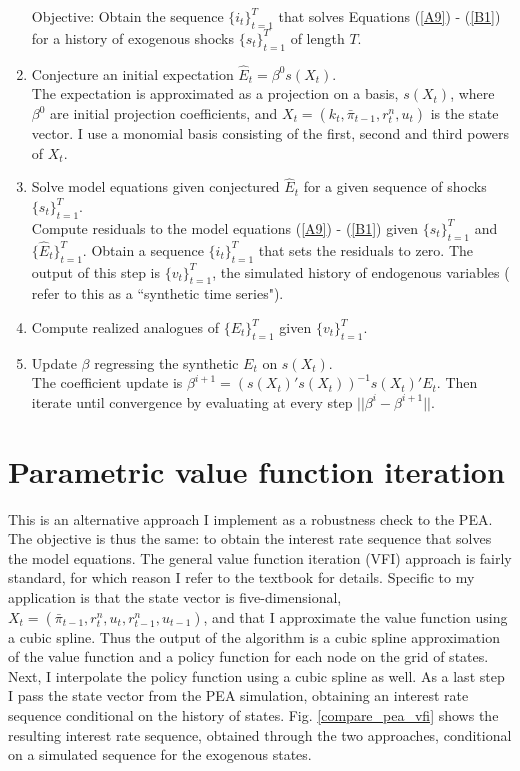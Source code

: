 \documentclass[11pt]{article}
\renewcommand{\[}{\begin{equation}}
\renewcommand{\]}{\end{equation}}
\begin{document}
\begin{enumerate}
\item[Objective:] Obtain the sequence $\{i_t\}_{t=1}^T$ that solves Equations (\ref{A9}) - (\ref{B1}) for a history of exogenous shocks $\{s_t\}_{t=1}^T$ of length $T$. 
\item Conjecture an initial expectation $\hat{E}_t=\beta^0 s(X_t)$. \\
The expectation is approximated as a projection on a basis, $s(X_t)$, where $\beta^0$ are initial projection coefficients, and $X_t = (k_t,\bar{\pi}_{t-1}, r^n_t, u_t)$ is the state vector. I use a monomial basis consisting of the first, second and third powers of $X_t$.
\item Solve model equations given conjectured $\hat{E}_t$ for a given sequence of shocks $\{s_t\}_{t=1}^T$.\\
Compute residuals to the model equations (\ref{A9}) - (\ref{B1}) given $\{s_t\}_{t=1}^T$ and $\{\hat{E}_t\}_{t=1}^T$. Obtain a sequence $\{i_t\}_{t=1}^T$ that sets the residuals to zero. The output of this step is $\{v_t\}_{t=1}^T$, the simulated history of endogenous variables (\cite{christiano2000occasionally} refer to this as a ``synthetic time series"). 
\item Compute realized analogues of $\{E_t\}_{t=1}^T$ given $\{v_t\}_{t=1}^T$.
\item Update $\beta$ regressing the synthetic $E_t$ on $s(X_t)$.\\
The coefficient update is $\beta^{i+1} = (s(X_t)'s(X_t))^{-1}s(X_t)'E_t$. Then iterate until convergence by evaluating at every step $||\beta^i-\beta^{i+1}||$.
\end{enumerate}

\section{Parametric value function iteration} \label{vfi}
This is an alternative approach I implement as a robustness check to the PEA. The objective is thus the same: to obtain the interest rate sequence that solves the model equations. The general value function iteration (VFI) approach is fairly standard, for which reason I refer to the \cite{judd1998numerical} textbook for details. Specific to my application is that the state vector is five-dimensional, $X_t = (\bar{\pi}_{t-1}, r^n_t, u_t, r^n_{t-1}, u_{t-1})$, and that I approximate the value function using a cubic spline. Thus the output of the algorithm is a cubic spline approximation of the value function and a policy function for each node on the grid of states. Next, I interpolate the policy function using a cubic spline as well. As a last step I pass the state vector from the PEA simulation, obtaining an interest rate sequence conditional on the history of states. Fig. \ref{compare_pea_vfi} shows the resulting interest rate sequence, obtained through the two approaches, conditional on a  simulated sequence for the exogenous states.
\end{document}
